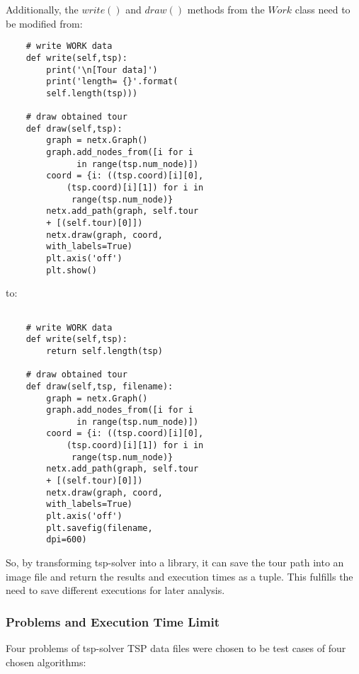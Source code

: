 \documentclass[conference]{IEEEtran}
\begin{document}
    Additionally, the $write()$ and $draw()$ methods from the $Work$ class need to be modified from:

    \begin{verbatim}
    # write WORK data 
    def write(self,tsp):
        print('\n[Tour data]')
        print('length= {}'.format(
        self.length(tsp)))

    # draw obtained tour
    def draw(self,tsp):
        graph = netx.Graph()
        graph.add_nodes_from([i for i 
              in range(tsp.num_node)])
        coord = {i: ((tsp.coord)[i][0], 
        	(tsp.coord)[i][1]) for i in 
        	 range(tsp.num_node)}
        netx.add_path(graph, self.tour 
        + [(self.tour)[0]])
        netx.draw(graph, coord, 
        with_labels=True)
        plt.axis('off')
        plt.show()
    \end{verbatim}

    to:

    \begin{verbatim}
 
    # write WORK data 
    def write(self,tsp):
        return self.length(tsp)
 
    # draw obtained tour
    def draw(self,tsp, filename):
        graph = netx.Graph()
        graph.add_nodes_from([i for i 
              in range(tsp.num_node)])
        coord = {i: ((tsp.coord)[i][0], 
        	(tsp.coord)[i][1]) for i in
        	 range(tsp.num_node)}
        netx.add_path(graph, self.tour 
        + [(self.tour)[0]])
        netx.draw(graph, coord, 
        with_labels=True)
        plt.axis('off')
        plt.savefig(filename, 
        dpi=600)

    \end{verbatim}

    So, by transforming tsp-solver into a library, it can save the tour path into an image file and return the results and execution times as a tuple. This fulfills the need to save different executions for later analysis.

    \subsubsection{Problems and Execution Time Limit}

    Four problems of tsp-solver TSP data files were chosen to be test cases of four chosen algorithms:
\end{document}
